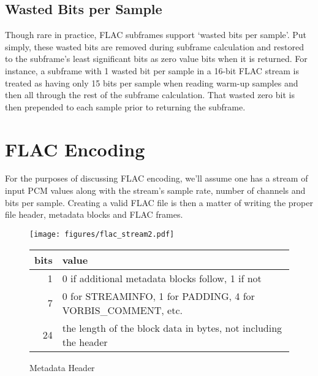 \subsection{Wasted Bits per Sample}
Though rare in practice, FLAC subframes support `wasted bits per sample'.
Put simply, these wasted bits are removed during subframe calculation
and restored to the subframe's least significant bits as zero value bits
when it is returned.
For instance, a subframe with 1 wasted bit per sample in a 16-bit FLAC
stream is treated as having only 15 bits per sample when reading
warm-up samples and then all through the rest of the subframe
calculation.
That wasted zero bit is then prepended to each sample prior to returning
the subframe.

\clearpage

\section{FLAC Encoding}
For the purposes of discussing FLAC encoding,
we'll assume one has a stream of input PCM values along with the
stream's sample rate, number of channels and bits per sample.
Creating a valid FLAC file is then a matter of writing the proper
file header, metadata blocks and FLAC frames.
\begin{figure}[h]
\texttt{[image: figures/flac\_stream2.pdf]}
\end{figure}

\begin{figure}[h]
\begin{tabular}{|r|l|}
\hline
bits & value \\
\hline
1 & 0 if additional metadata blocks follow, 1 if not \\
7 & 0 for STREAMINFO, 1 for PADDING, 4 for VORBIS\_COMMENT, etc. \\
24 & the length of the block data in bytes, not including the header \\
\hline
\end{tabular}
\caption{Metadata Header}
\end{figure}

